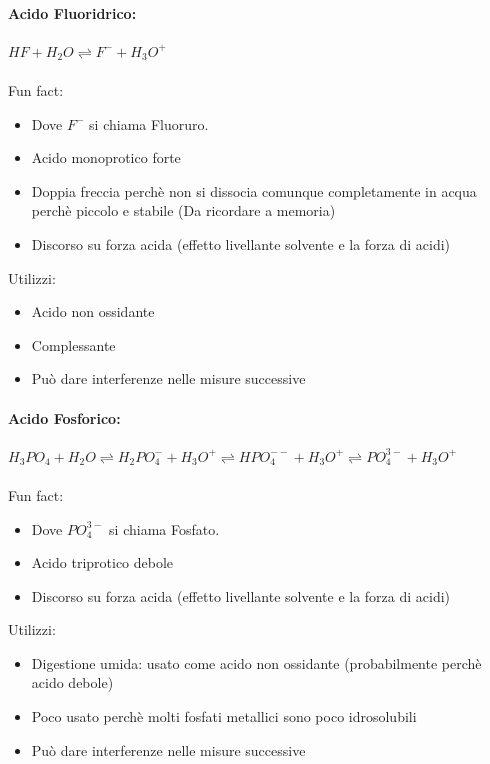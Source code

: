 \documentclass{article}
\begin{document}
\paragraph{Acido Fluoridrico: } $HF + H_2O \rightleftharpoons F^- + H_3O^+$ 
\\\\
Fun fact:
\begin{itemize}
	\item Dove $F^-$ si chiama Fluoruro.
	\item Acido monoprotico forte
	\item Doppia freccia perchè non si dissocia comunque completamente in acqua perchè piccolo e stabile (Da ricordare a memoria)
	\item Discorso su forza acida (effetto livellante solvente e la forza di acidi)
\end{itemize}
%
Utilizzi:
\begin{itemize}
	\item Acido non ossidante
	\item Complessante
	\item Può dare interferenze nelle misure successive
\end{itemize}
\hrulefill
\paragraph{Acido Fosforico: } $H_3PO_4 + H_2O \rightleftharpoons H_2PO_4^- + H_3O^+ \rightleftharpoons HPO_4^{--} + H_3O^+ \rightleftharpoons PO_4^{3-} + H_3O^+$
\\\\
Fun fact:
\begin{itemize}
	\item Dove $PO_4^{3-}$ si chiama Fosfato.
	\item Acido triprotico debole
	\item Discorso su forza acida (effetto livellante solvente e la forza di acidi)
\end{itemize}
%
Utilizzi:
\begin{itemize}
	\item Digestione umida: usato come acido non ossidante (probabilmente perchè acido debole)
	\item Poco usato perchè molti fosfati metallici sono poco idrosolubili
	\item Può dare interferenze nelle misure successive
\end{itemize}
\hrulefill
\end{document}
